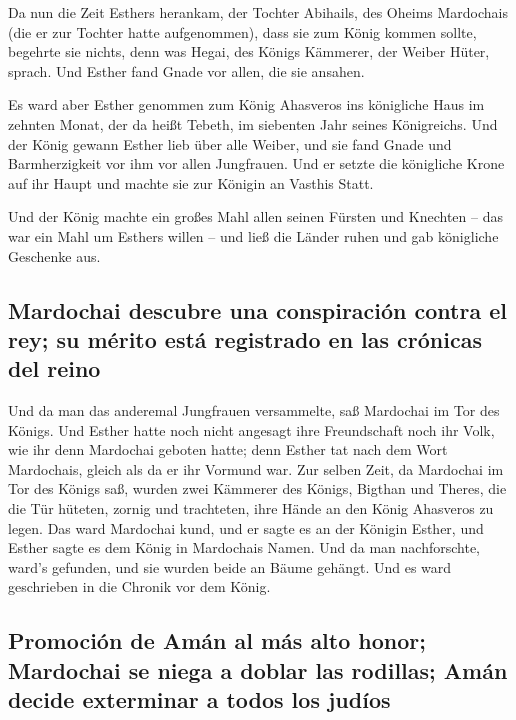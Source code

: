  Da nun die Zeit Esthers herankam, der Tochter Abihails,
des Oheims Mardochais (die er zur Tochter hatte aufgenommen), dass sie
zum König kommen sollte, begehrte sie nichts, denn was Hegai, des Königs
Kämmerer, der Weiber Hüter, sprach. Und Esther fand Gnade vor allen, die
sie ansahen.

 Es ward aber Esther genommen zum König Ahasveros ins
königliche Haus im zehnten Monat, der da heißt Tebeth, im siebenten Jahr
seines Königreichs.  Und der König gewann Esther lieb
über alle Weiber, und sie fand Gnade und Barmherzigkeit vor ihm vor
allen Jungfrauen. Und er setzte die königliche Krone auf ihr Haupt und
machte sie zur Königin an Vasthis Statt.

 Und der König machte ein großes Mahl allen seinen
Fürsten und Knechten -- das war ein Mahl um Esthers willen -- und ließ
die Länder ruhen und gab königliche Geschenke aus.

\hypertarget{mardochai-descubre-una-conspiraciuxf3n-contra-el-rey-su-muxe9rito-estuxe1-registrado-en-las-cruxf3nicas-del-reino}{%
\subsection{Mardochai descubre una conspiración contra el rey; su mérito
está registrado en las crónicas del
reino}\label{mardochai-descubre-una-conspiraciuxf3n-contra-el-rey-su-muxe9rito-estuxe1-registrado-en-las-cruxf3nicas-del-reino}}

 Und da man das anderemal Jungfrauen versammelte, saß
Mardochai im Tor des Königs.  Und Esther hatte noch nicht
angesagt ihre Freundschaft noch ihr Volk, wie ihr denn Mardochai geboten
hatte; denn Esther tat nach dem Wort Mardochais, gleich als da er ihr
Vormund war.  Zur selben Zeit, da Mardochai im Tor des
Königs saß, wurden zwei Kämmerer des Königs, Bigthan und Theres, die die
Tür hüteten, zornig und trachteten, ihre Hände an den König Ahasveros zu
legen.  Das ward Mardochai kund, und er sagte es an der
Königin Esther, und Esther sagte es dem König in Mardochais Namen.
 Und da man nachforschte, ward's gefunden, und sie wurden
beide an Bäume gehängt. Und es ward geschrieben in die Chronik vor dem
König.

\hypertarget{promociuxf3n-de-amuxe1n-al-muxe1s-alto-honor-mardochai-se-niega-a-doblar-las-rodillas-amuxe1n-decide-exterminar-a-todos-los-juduxedos}{%
\subsection{Promoción de Amán al más alto honor; Mardochai se niega a
doblar las rodillas; Amán decide exterminar a todos los
judíos}\label{promociuxf3n-de-amuxe1n-al-muxe1s-alto-honor-mardochai-se-niega-a-doblar-las-rodillas-amuxe1n-decide-exterminar-a-todos-los-juduxedos}}

